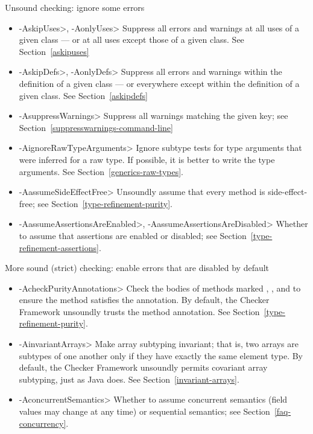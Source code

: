 Unsound checking: ignore some errors
\begin{itemize}
\item \<-AskipUses>, \<-AonlyUses> 
  Suppress all errors and warnings at all uses of a given class --- or at all
  uses except those of a given class.  See Section~\ref{askipuses}
\item \<-AskipDefs>, \<-AonlyDefs>
  Suppress all errors and warnings within the definition of a given class
  --- or everywhere except within the definition of a given class.  See
  Section~\ref{askipdefs}
\item \<-AsuppressWarnings>
  Suppress all warnings matching the given key; see
  Section~\ref{suppresswarnings-command-line}
\item \<-AignoreRawTypeArguments>
  Ignore subtype tests for type arguments that were inferred for a raw
  type.  If possible, it is better to write the type arguments.  See
  Section~\ref{generics-raw-types}.
\item \<-AassumeSideEffectFree>
  Unsoundly assume that every method is side-effect-free; see
  Section~\ref{type-refinement-purity}.
\item \<-AassumeAssertionsAreEnabled>, \<-AassumeAssertionsAreDisabled>
  Whether to assume that assertions are enabled or disabled; see Section~\ref{type-refinement-assertions}.
\end{itemize}

\label{unsound-by-default}
More sound (strict) checking: enable errors that are disabled by default
\begin{itemize}
\item \<-AcheckPurityAnnotations>
  Check the bodies of methods marked
  ,
  ,
  and 
  to ensure the method satisfies the annotation.  By default,
  the Checker Framework unsoundly trusts the method annotation.  See
  Section~\ref{type-refinement-purity}.
\item \<-AinvariantArrays>
  Make array subtyping invariant; that is, two arrays are subtypes of one
  another only if they have exactly the same element type.  By default,
  the Checker Framework unsoundly permits covariant array subtyping, just
  as Java does.  See Section~\ref{invariant-arrays}.
\item \<-AconcurrentSemantics>
  Whether to assume concurrent semantics (field values may change at any
  time) or sequential semantics; see Section~\ref{faq-concurrency}.
\end{itemize}

